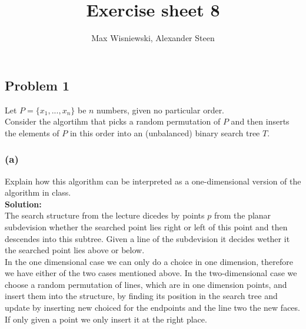 \documentclass[11pt,a4paper,ngerman]{article}
\date{}
\title{Exercise sheet 8}
\author{Max Wisniewski, Alexander Steen}
\begin{document}

\renewcommand{\figurename}{Figure}

\maketitle
\thispagestyle{fancy}

\subsection*{Problem 1}

Let $P = \{ x_1, ..., x_n\}$ be $n$ numbers, given no particular order.\\

Consider the algortihm that picks a random permutation of $P$ and then inserts the elements of $P$ in this order into
an (unbalanced) binary search tree $T$.

\subsubsection*{(a)}

Explain how this algorithm can be interpreted as a one-dimensional version of the algorithm in class.\\

\textbf{Solution:}\\

The search structure from the lecture dicedes by points $p$ from the planar subdevision whether the searched point
lies right or left of this point and then descendes into this subtree. Given a line of the subdevision it decides
wether it the searched point lies above or below.\\

In the one dimensional case we can only do a choice in one dimension, therefore we have either of the two cases
mentioned above. In the two-dimensional case we choose a random permutation of lines, which are in one dimension points,
and insert them into the structure, by finding its position in the search tree and update by inserting new choiced
for the endpoints and the line two the new faces. If only given a point we only insert it at the right place.\\
\end{document}

